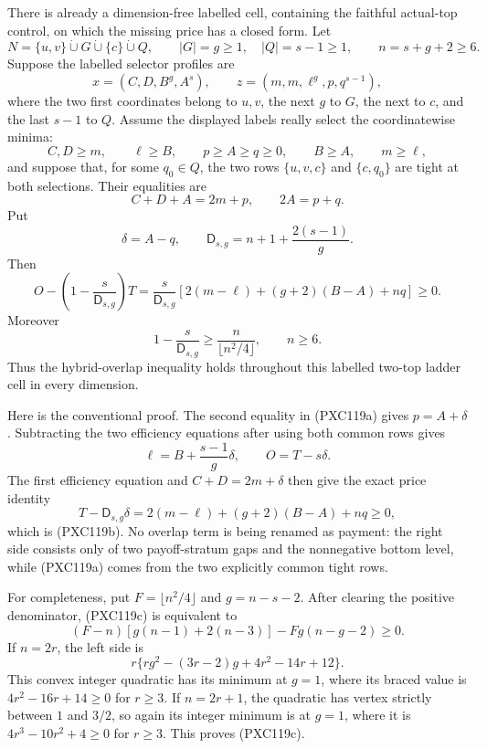 \documentclass[11pt]{article}
\begin{document}
There is already a dimension-free labelled cell, containing the faithful
actual-top control, on which the missing price has a closed form.  Let
\[
 N=\{u,v\}\mathbin{\dot\cup}G\mathbin{\dot\cup}\{c\}
      \mathbin{\dot\cup}Q,\qquad |G|=g\ge1,\quad |Q|=s-1\ge1,
 \qquad n=s+g+2\ge6.
\]
Suppose the labelled selector profiles are
\[
 x=(C,D,B^g,A^s),\qquad
 z=(m,m,\ell^g,p,q^{s-1}),
\]
where the two first coordinates belong to \(u,v\), the next \(g\) to
\(G\), the next to \(c\), and the last \(s-1\) to \(Q\).  Assume the
displayed labels really select the coordinatewise minima:
\[
 C,D\ge m,\qquad \ell\ge B,\qquad p\ge A\ge q\ge0,
 \qquad B\ge A,\qquad m\ge\ell,
\]
and suppose that, for some \(q_0\in Q\), the two rows
\(\{u,v,c\}\) and \(\{c,q_0\}\) are tight at both selections.  Their
equalities are
\[
 C+D+A=2m+p,\qquad 2A=p+q.                    \tag{PXC119a}
\]
Put
\[
 \delta=A-q,\qquad
 \mathsf D_{s,g}=n+1+\frac{2(s-1)}g.
\]
Then
\begin{equation}
 \boxed{\quad
 O-\left(1-\frac{s}{\mathsf D_{s,g}}\right)T
 =\frac{s}{\mathsf D_{s,g}}
   \left[2(m-\ell)+(g+2)(B-A)+nq\right]\ge0.
 \quad}                                                \tag{PXC119b}
\end{equation}
Moreover
\begin{equation}
 1-\frac{s}{\mathsf D_{s,g}}
 \ge \frac{n}{\lfloor n^2/4\rfloor},\qquad n\ge6.     \tag{PXC119c}
\end{equation}
Thus the hybrid-overlap inequality holds throughout this labelled
two-top ladder cell in every dimension.

Here is the conventional proof.  The second equality in (PXC119a) gives
\(p=A+\delta\).  Subtracting the two efficiency equations after using both
common rows gives
\[
 \ell=B+\frac{s-1}{g}\delta,\qquad
 O=T-s\delta.
\]
The first efficiency equation and \(C+D=2m+\delta\) then give the exact
price identity
\[
 T-\mathsf D_{s,g}\delta
 =2(m-\ell)+(g+2)(B-A)+nq\ge0,
\]
which is (PXC119b).  No overlap term is being renamed as payment: the right
side consists only of two payoff-stratum gaps and the nonnegative bottom
level, while (PXC119a) comes from the two explicitly common tight rows.

For completeness, put \(F=\lfloor n^2/4\rfloor\) and
\(g=n-s-2\).  After clearing the positive denominator,
(PXC119c) is equivalent to
\[
 (F-n)[g(n-1)+2(n-3)]-Fg(n-g-2)\ge0.                 \tag{PXC119d}
\]
If \(n=2r\), the left side is
\[
 r\{rg^2-(3r-2)g+4r^2-14r+12\}.
\]
This convex integer quadratic has its minimum at \(g=1\), where its
braced value is \(4r^2-16r+14\ge0\) for \(r\ge3\).  If \(n=2r+1\), the
quadratic has vertex strictly between \(1\) and \(3/2\), so again its
integer minimum is at \(g=1\), where it is
\(4r^3-10r^2+4\ge0\) for \(r\ge3\).  This proves (PXC119c).
\end{document}
